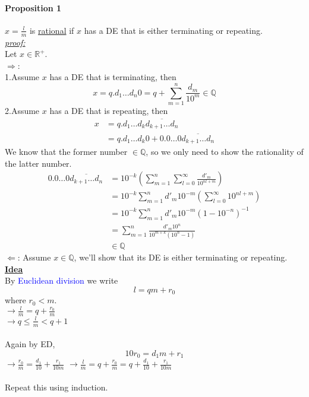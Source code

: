\documentclass[11pt]{article}
\newcommand{\real}[0]{\mathbb{R}}
\newcommand{\under}[1]{\underline{#1}}
\newcommand{\proof}[0]{\textit{\underline{proof:} }}
\newcommand{\rational}[0]{\mathbb{Q}}
\begin{document}
\paragraph{Proposition 1} $x = \frac{l}{m}$ is \under{rational} if $x$ has a DE that is either terminating or repeating. \\
\proof\\
Let $x \in \real^+$. \\
$\Rightarrow$: \\
1.Assume $x$ has a DE that is terminating, then
$$x = q.d_1\hdots d_n 0 = q + \sum_{m=1}^n \frac{d_m}{10^m} \in \mathbb{Q}$$
2.Assume $x$ has a DE that is repeating, then
\begin{align*}
	x &= q.d_1\hdots d_k \overline{d_{k+1}\hdots d_n} \\
	&= q.d_1 \hdots d_k 0 + 0.0\hdots0 \overline{d_{k+1}\hdots d_n}
\end{align*}
We know that the former number $\in \mathbb{Q}$, so we only need to show the rationality of the latter number.
\begin{align*}
	0.0\hdots0 \overline{d_{k+1}\hdots d_n} &= 10^{-k}(\sum_{m=1}^n\sum_{l=0}^{\infty} \frac{d'_m}{10^{nl+m}}) \tag{denote $d'_0, \hdots, d'_n$ be the repeated digits}\\
	&= 10^{-k}\sum_{m=1}^n d'_m 10^{-m}(\sum_{l=0}^{\infty}10^{nl+m}) \tag{decompose}\\
	&= 10^{-k} \sum_{m=1}^n d'_m 10^{-m}(1-10^{-n})^{-1} \tag{geometric series} \\
	&= \sum_{m=1}^n \frac{d'_m 10^n}{10^{m+k}(10^n - 1)} \tag{make it look nicer} \\
	&\in \mathbb{Q}
\end{align*}
$\Leftarrow$: Assume $x \in \rational$, we'll show that its DE is either terminating or repeating. \\
\textbf{\under{Idea}} \\
By \textcolor{blue}{Euclidean division} we write
$$l = qm + r_0$$
where $r_0 < m$. \\
$\rightarrow \frac{l}{m} = q + \frac{r_0}{m}$\\
$\rightarrow q \leq \frac{l}{m} < q+1$ \\\\
Again by ED,
$$10r_0 = d_1m + r_1$$
$\rightarrow \frac{r_0}{m} = \frac{d_1}{10} + \frac{r_1}{10m}$
$\rightarrow \frac{l}{m} = q + \frac{r_0}{m} = q + \frac{d_1}{10} + \frac{r_1}{10m}$\\\\
Repeat this using induction.\\
\end{document}
